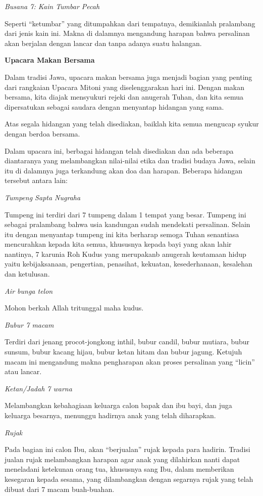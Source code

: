 \documentclass[a5paper,headsepline,titlepage,10pt,nnormalheadings,DIVcalc,twoside]{scrbook}
\begin{document}
{\textit{Busana 7: Kain Tumbar Pecah}
 
Seperti “ketumbar” yang ditumpahkan dari tempatnya, demikianlah pralambang dari jenis kain ini. Makna di dalamnya mengandung harapan bahwa persalinan akan berjalan dengan lancar dan tanpa adanya suatu halangan.
 
\textbf{Upacara Makan Bersama}
 
Dalam tradisi Jawa, upacara makan bersama juga menjadi bagian yang penting dari rangkaian Upacara Mitoni yang diselenggarakan hari ini. Dengan makan bersama, kita diajak mensyukuri rejeki dan anugerah Tuhan, dan kita semua dipersatukan sebagai saudara dengan menyantap hidangan yang sama.
 
Atas segala hidangan yang telah disediakan, baiklah kita semua mengucap syukur dengan berdoa bersama.
 
 
Dalam upacara ini, berbagai hidangan telah disediakan dan ada beberapa diantaranya yang melambangkan nilai-nilai etika dan tradisi budaya Jawa, selain itu di dalamnya juga terkandung akan doa dan harapan. Beberapa hidangan tersebut antara lain:
 
\textit{Tumpeng Sapta Nugraha}

Tumpeng ini terdiri dari 7 tumpeng dalam 1 tempat yang besar. Tumpeng ini sebagai pralambang bahwa usia kandungan sudah mendekati persalinan. Selain itu dengan menyantap tumpeng ini kita berharap semoga Tuhan senantiasa mencurahkan kepada kita semua, khususnya kepada bayi yang akan lahir nantinya, 7 karunia Roh Kudus yang merupakanb anugerah keutamaan hidup yaitu kebijaksanaan, pengertian, penasihat, kekuatan, kesederhanaan, kesalehan dan ketulusan. 

\textit{Air bunga telon}

Mohon berkah Allah tritunggal maha kudus.
 
\textit{Bubur 7 macam}

Terdiri dari jenang procot-jongkong inthil, bubur candil, bubur mutiara, bubur sunsum, bubur kacang hijau, bubur ketan hitam dan bubur jagung. Ketujuh macam ini mengandung makna pengharapan akan proses persalinan yang “licin” atau lancar.
 
\textit{Ketan/Jadah 7 warna}

Melambangkan kebahagiaan keluarga calon bapak dan ibu bayi, dan juga keluarga besarnya, menunggu hadirnya anak yang telah diharapkan.
 
\textit{Rujak}

Pada bagian ini calon Ibu, akan “berjualan” rujak kepada para hadirin. Tradisi jualan rujak melambangkan harapan agar anak yang dilahirkan nanti dapat meneladani ketekunan orang tua, khususnya sang Ibu, dalam memberikan kesegaran kepada sesama, yang dilambangkan dengan segarnya rujak yang telah dibuat dari 7 macam buah-buahan.
 
}
\end{document}
